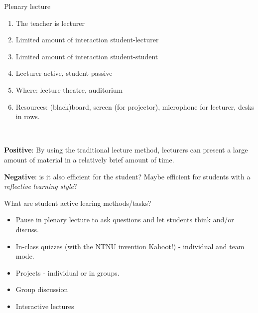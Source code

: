 \documentclass[10pt,ignorenonframetext,]{beamer}
\providecommand{\tightlist}{%
  \setlength{\itemsep}{0pt}\setlength{\parskip}{0pt}}
\begin{document}
\begin{frame}

\begin{block}{Plenary lecture}

\begin{enumerate}
\def\labelenumi{\arabic{enumi})}
\tightlist
\item
  The teacher is lecturer
\item
  Limited amount of interaction student-lecturer
\item
  Limited amount of interaction student-student
\item
  Lecturer active, student passive
\item
  Where: lecture theatre, auditorium
\item
  Resources: (black)board, screen (for projector), microphone for
  lecturer, desks in rows.
\end{enumerate}

~

\textbf{Positive}: By using the traditional lecture method, lecturers
can present a large amount of material in a relatively brief amount of
time.

\textbf{Negative}: is it also efficient for the student? Maybe efficient
for students with a \emph{reflective learning style}?

\end{block}

\end{frame}

\begin{frame}

\begin{block}{What are student active learing methods/tasks?}

\begin{itemize}
\tightlist
\item
  Pause in plenary lecture to ask questions and let students think
  and/or discuss.
\item
  In-class quizzes (with the NTNU invention Kahoot!) - individual and
  team mode.
\item
  Projects - individual or in groups.
\item
  Group discussion
\item
  Interactive lectures
\end{itemize}

\end{block}

\end{frame}
\end{document}
